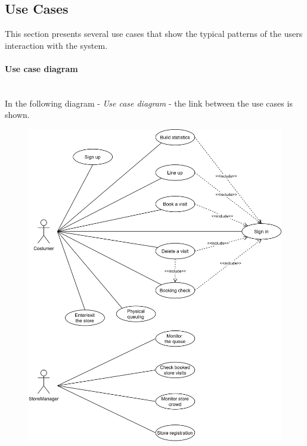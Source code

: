 \documentclass[]{article}
\begin{document}
	
	
		




		\subsection{Use Cases}
		This section presents several use cases that show the typical patterns of the users interaction with the system.
		
			\paragraph{Use case diagram}
			\textbf{}\\ \medskip
			In the following diagram - \textit{Use case diagram} - the link between the use cases is shown.  
			\begin{figure}[H]
				\centering
				\includegraphics[scale=1]{usecasediagram.png}
				\caption{}
				\label{fig:usecasediagram}
			\end{figure}
					
\end{document}
